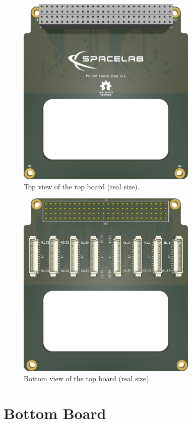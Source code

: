 \begin{figure}[!htb]
    \begin{center}
        \includegraphics[width=8.636cm]{figures/pc104-adapter-top-top}
        \caption{Top view of the top board (real size).}
        \label{fig:top-board-top}
    \end{center}
\end{figure}

\begin{figure}[!htb]
    \begin{center}
        \includegraphics[width=8.636cm]{figures/pc104-adapter-top-bottom}
        \caption{Bottom view of the top board (real size).}
        \label{fig:top-board-bottom}
    \end{center}
\end{figure}

\section{Bottom Board}

